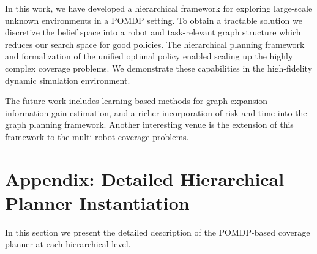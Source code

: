 \documentclass[letterpaper]{article} %
\begin{document}


In this work, we have developed a hierarchical framework for exploring large-scale unknown environments in a POMDP setting. 
To obtain a tractable solution we discretize the belief space into a robot and task-relevant graph structure which reduces our search space for good policies.
The hierarchical planning framework and formalization of the unified optimal policy enabled scaling up the highly complex coverage problems.
We demonstrate these capabilities in the high-fidelity dynamic simulation environment.  

The future work includes learning-based methods for graph expansion information gain estimation, and a richer incorporation of risk and time into the graph planning framework.
Another interesting venue is the extension of this framework to the multi-robot coverage problems.







\appendix
\section{Appendix: Detailed Hierarchical Planner Instantiation}\label{sec:appendix}

In this section we present the detailed description of the POMDP-based coverage planner at each hierarchical level.



\end{document}
